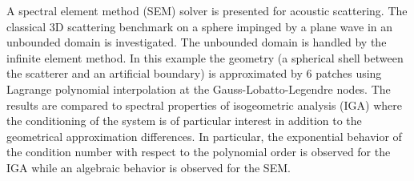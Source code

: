 A spectral element method (SEM) solver is presented for acoustic scattering. The classical 3D scattering benchmark on a sphere impinged by a plane wave in an unbounded domain is investigated. The unbounded domain is handled by the infinite element method. In this example the geometry (a spherical shell between the scatterer and an artificial boundary) is approximated by 6 patches using Lagrange polynomial interpolation at the Gauss-Lobatto-Legendre nodes. The results are compared to spectral properties of isogeometric analysis (IGA) where the conditioning of the system is of particular interest in addition to the geometrical approximation differences. In particular, the exponential behavior of the condition number with respect to the polynomial order is observed for the IGA while an algebraic behavior is observed for the SEM.